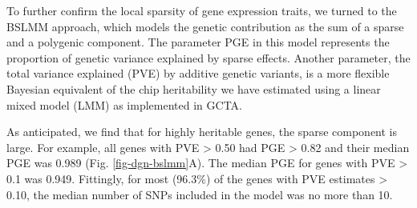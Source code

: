 \documentclass[10pt,letterpaper]{article}
\begin{document}
To further confirm the local sparsity of gene expression traits, we turned to the BSLMM \cite{Zhou_2013} approach, which models the genetic contribution as the sum of a sparse and a polygenic component. The parameter PGE in this model represents the proportion of genetic variance explained by sparse effects. Another parameter, the total variance explained (PVE) by additive genetic variants, is a more flexible Bayesian equivalent of the chip heritability we have estimated using a linear mixed model (LMM) as implemented in GCTA. 

As anticipated, we find that for highly heritable genes, the sparse component is large. For example, all genes with PVE \textgreater{} 0.50 had PGE \textgreater{} 0.82 and their median PGE was 0.989 (Fig. \ref{fig-dgn-bslmm}A). The median PGE for genes with PVE \textgreater{} 0.1 was 0.949. Fittingly, for most (96.3\%) of the genes with PVE estimates \textgreater{} 0.10, the median number of SNPs included in the model was no more than 10.
\end{document}
